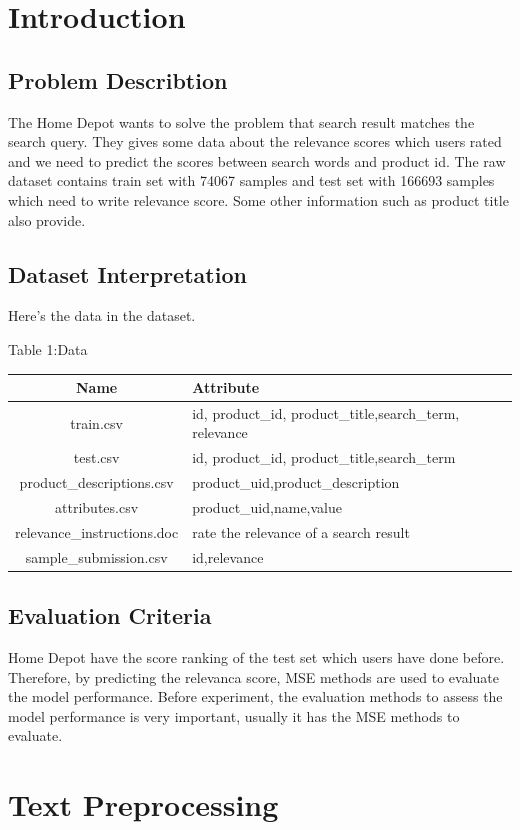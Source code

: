 \section{Introduction}\label{sec-intro}
\subsection{Problem Describtion}
\smallskip
The Home Depot wants to solve the problem that search result matches the search query. They gives some data about the relevance scores which users rated and we need to predict the scores between search words and product id. The raw dataset contains train set with 74067 samples and test set with 166693 samples which need to write relevance score. Some other information such as product title also provide.
\subsection{Dataset Interpretation}
\smallskip
Here's the data in the dataset.\\
\bigskip
\centerline{\normalsize{Table 1:Data}}
	\begin{tabular}{cp{8cm}<{\centering}p{14cm}<{\centering}}
		\hline
		Name&Attribute\\
		\hline
		train.csv& id, product_id, product_title,search_term, relevance\\
		test.csv& id, product_id, product_title,search_term\\
		product_descriptions.csv& product_uid,product_description\\
		attributes.csv& product_uid,name,value\\
		relevance_instructions.doc& rate the relevance of a search result \\
		sample_submission.csv& id,relevance\\
		\hline
	\end{tabular}
\subsection{Evaluation Criteria}
Home Depot have the score ranking of the test set which users have done before. Therefore, by predicting the relevanca score, MSE methods are used to evaluate the model performance.
Before experiment,  the evaluation methods to assess the model performance is very important, usually it has the MSE methods to evaluate.
\section{Text Preprocessing} \label{sec-preliminaries}	
